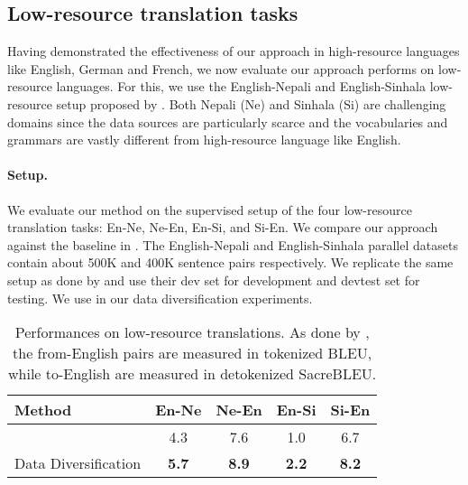 \documentclass{article}
\begin{document}
\vspace{-0.5em}
\subsection{Low-resource translation tasks}

Having demonstrated the effectiveness of our approach in high-resource languages like English, German and French, we now evaluate our approach performs on low-resource languages. {For this, we use the English-Nepali and English-Sinhala low-resource setup proposed by \citet{flores}.}
Both Nepali (Ne) and Sinhala (Si) are challenging domains since the data sources are particularly scarce and the vocabularies and grammars are vastly different from high-resource language like English. 


\vspace{-0.5em}
\paragraph{Setup.} {We evaluate our method on the supervised setup of the four low-resource translation tasks: En-Ne, Ne-En, En-Si, and Si-En. We compare our approach against the baseline in \citet{flores}. The English-Nepali and English-Sinhala parallel datasets contain about 500K and 400K sentence pairs respectively. We replicate the same setup as done by \citet{flores} and use their dev set for development and devtest set for testing. We use  in our data diversification experiments. }

\vspace{-1em}
\begin{table}[h!]
\begin{center}
\caption{Performances on low-resource translations. As done by \citet{flores}, the from-English pairs are measured in tokenized BLEU, while to-English are measured in detokenized SacreBLEU.}
\begin{tabular}{lcccc}
\toprule
{\bf Method}                  & {\bf En-Ne} & {\bf Ne-En} & {\bf En-Si} & {\bf Si-En}\\
\midrule
\citet{flores}                    & 4.3         & 7.6         & 1.0        & 6.7       \\
\midrule
Data Diversification                    & \textbf{5.7}         & \textbf{8.9}         & \textbf{2.2}        & \textbf{8.2}       \\
\bottomrule
\end{tabular}
\label{table:data_diverse_low_resource}
\end{center}
\end{table}
\end{document}

